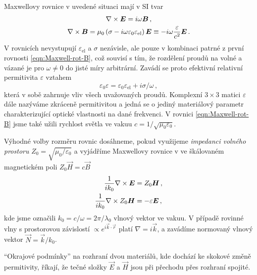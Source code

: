 Maxwellovy rovnice v uvedené situaci mají v SI tvar
\begin{subequations}
\label{eqn:Maxwell-rot}
\begin{gather}
    \nabla\times \bm{E}=i\omega\bm{B} \,, \label{eqn:Maxwell-rot-E} \\
    \nabla\times \bm{B}=\mu_0 \left( \sigma - i\omega \varepsilon_0 \varepsilon_{\textrm{el}} \right) \bm{E} 
        \equiv -i\omega\frac{\varepsilon}{c^2} \bm{E} \,. \label{eqn:Maxwell-rot-B}
\end{gather}
\end{subequations}
V rovnicích nevystupují $\varepsilon_{\textrm{el}}$ a $\sigma$ nezávisle, ale pouze v kombinaci patrné z první rovnosti \eqref{eqn:Maxwell-rot-B}, což souvisí s tím, že rozdělení proudů na volné a vázané je pro $\omega\neq 0$ do jisté míry arbitrární.
Zavádí se proto efektivní relativní permitivita $\varepsilon$ vztahem
\begin{equation}
    \varepsilon_0 \varepsilon=\varepsilon_0 \varepsilon_{\textrm{el}}+i\sigma/\omega \,,
\end{equation}
která v sobě zahrnuje vliv všech uvažovaných proudů.
Komplexní $3\times 3$ matici $\varepsilon$ dále nazýváme zkráceně permitivitou a jedná se o jediný materiálový parametr charakterizující optické vlastnosti na dané frekvenci.
V rovnici \eqref{eqn:Maxwell-rot-B} jsme také užili rychlost světla ve vakuu $c=1/\sqrt{\mu_0 \varepsilon_0}$.

Výhodné volby rozměru rovnic dosáhneme, pokud využijeme \emph{im\-pe\-dan\-ci volného prostoru} $Z_0 = \sqrt{\mu_0/\varepsilon_0}$ a vyjádříme Maxwellovy rovnice v ve škálovaném magnetickém poli $Z_0 \vec{H}=c \vec{B}$
\begin{subequations}
\label{eqn:rot-ME}    
\begin{align}
\frac{1}{ik_0} \nabla\times \bm{E} &= Z_0 \bm{H} \,, \label{eqn:rot-E}\\
    \frac{1}{ik_0}  \nabla\times Z_0 \bm{H} &=-\varepsilon \bm{E} \,, \label{eqn:rot-ZH}
\end{align}
\end{subequations}
kde jsme označili $k_0 = c/\omega = 2\pi/\lambda_0$ vlnový vektor ve vakuu.
V případě rovinné vlny s prostorovou závislostí $\propto e^{i \vec{k}\cdot \vec{r}}$ platí $\nabla = i\vec{k}$, a zavádíme normovaný vlnový vektor $\vec{N}=\vec{k}/k_0$.

``Okrajové podmínky'' na rozhraní dvou materiálů, kde dochází ke skokové změně permitivity, říkají, že tečné složky $\vec{E}$ a $\vec{H}$ jsou při přechodu přes rozhraní spojité\cite{bornPrinciplesOpticsElectromagnetic1999}.
